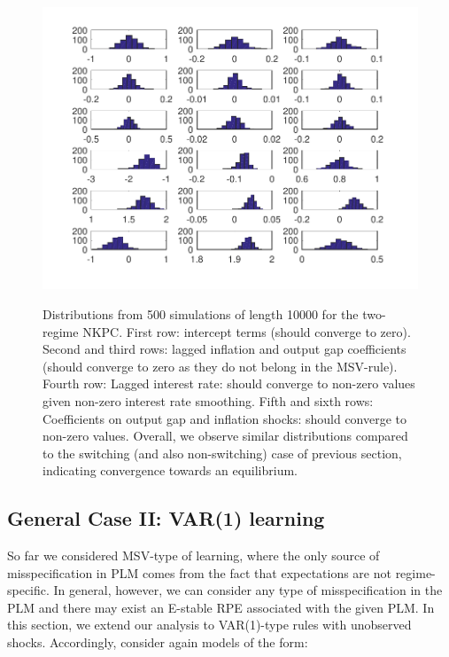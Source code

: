 \documentclass[12pt,reqno]{article}
\numberwithin{equation}{section}
\begin{document}
\begin{figure}[H]
\caption{Distributions from 500 simulations of length 10000 for the two-regime NKPC. First row: intercept terms (should converge to zero). Second and third rows: lagged inflation and output gap coefficients (should converge to zero as they do not belong in the MSV-rule). Fourth row: Lagged interest rate: should converge to non-zero values given non-zero interest rate smoothing. Fifth and sixth rows: Coefficients on output gap and inflation shocks: should converge to non-zero values. Overall, we observe similar distributions compared to the switching (and also non-switching) case of previous section, indicating convergence towards an equilibrium. }
\includegraphics[scale=1]{MC_MS_MSV_withLags.pdf}\\
\end{figure}


\newpage


\subsection*{General Case II: VAR(1) learning} 

So far we considered MSV-type of learning, where the only source of misspecification in PLM comes from the fact that expectations are not regime-specific. In general, however, we can consider any type of misspecification in the PLM and there may exist an E-stable RPE associated with the given PLM. In this section, we extend our analysis to VAR(1)-type rules with unobserved shocks. 
Accordingly, consider again models of the form:
\end{document}
